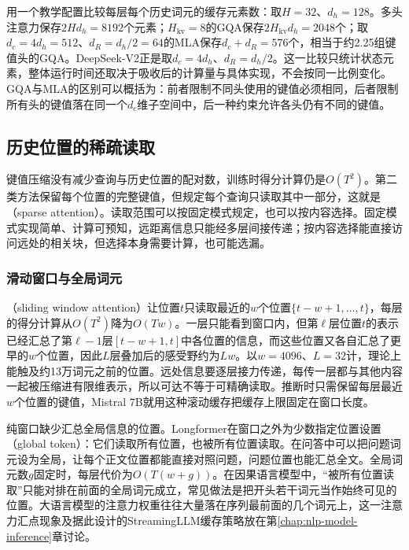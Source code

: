 用一个教学配置比较每层每个历史词元的缓存元素数：取$H=32$、$d_h=128$。多头注意力保存$2Hd_h=8192$个元素；$H_{\mathrm{kv}}=8$的GQA保存$2H_{\mathrm{kv}}d_h=2048$个；取$d_c=4d_h=512$、$d_R=d_h/2=64$的MLA保存$d_c+d_R=576$个，相当于约2.25组键值头的GQA。DeepSeek-V2正是取$d_c=4d_h$、$d_R=d_h/2$。这一比较只统计状态元素，整体运行时间还取决于吸收后的计算量与具体实现，不会按同一比例变化。GQA与MLA的区别可以概括为：前者限制不同头使用的键值必须相同，后者限制所有头的键值落在同一个$d_c$维子空间中，后一种约束允许各头仍有不同的键值。

\subsection{历史位置的稀疏读取}
\label{sec:nlp-llm-sparse-reading}

键值压缩没有减少查询与历史位置的配对数，训练时得分计算仍是$O(T^2)$。第二类方法保留每个位置的完整键值，但规定每个查询只读取其中一部分，这就是（sparse attention）。读取范围可以按固定模式规定，也可以按内容选择。固定模式实现简单、计算可预知，远距离信息只能经多层间接传递；按内容选择能直接访问远处的相关块，但选择本身需要计算，也可能选漏。

\subsubsection{滑动窗口与全局词元}
\label{sec:nlp-llm-sliding-window}

（sliding window attention）让位置$t$只读取最近的$w$个位置$\{t-w+1,\ldots,t\}$，每层的得分计算从$O(T^2)$降为$O(Tw)$。一层只能看到窗口内，但第$\ell$层位置$t$的表示已经汇总了第$\ell-1$层$[t-w+1,t]$中各位置的信息，而这些位置又各自汇总了更早的$w$个位置，因此$L$层叠加后的感受野约为$Lw$。以$w=4096$、$L=32$计，理论上能触及约13万词元之前的位置。远处信息要逐层接力传递，每传一层都与其他内容一起被压缩进有限维表示，所以可达不等于可精确读取。推断时只需保留每层最近$w$个位置的键值，Mistral 7B就用这种滚动缓存把缓存上限固定在窗口长度。

纯窗口缺少汇总全局信息的位置。Longformer在窗口之外为少数指定位置设置（global token）：它们读取所有位置，也被所有位置读取。在问答中可以把问题词元设为全局，让每个正文位置都能直接对照问题，问题位置也能汇总全文。全局词元数$g$固定时，每层代价为$O(T(w+g))$。在因果语言模型中，“被所有位置读取”只能对排在前面的全局词元成立，常见做法是把开头若干词元当作始终可见的位置。大语言模型的注意力权重往往大量落在序列最前面的几个词元上，这一注意力汇点现象及据此设计的StreamingLLM缓存策略放在第\ref{chap:nlp-model-inference}章讨论。

